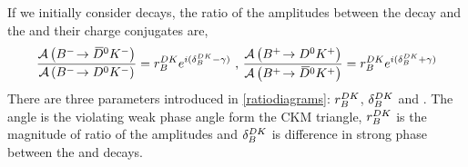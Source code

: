 If we initially consider \decay{\Bm}{\D\Km} decays, the ratio of the amplitudes between the \decay{\Bm}{\Dzb\Km} decay and the \decay{\Bm}{\Dz\Km} and their charge conjugates are,
\begin{equation}
\frac{\mathcal{A}\left({{{B}^-}}\!\rightarrow {\ensuremath{{\kern 0.2em\overline{\kern -0.2em D}{}}{}^0}}{\ensuremath{{K}^-}}\right)}{\mathcal{A}\left({{{B}^-}}\!\rightarrow {\ensuremath{{D}^0}}{\ensuremath{{K}^-}}\right)} = r_B^{DK} e^{i(\delta_B^{DK} - \gamma)} \text{ , }
\frac{\mathcal{A}\left({{{B}^+}}\!\rightarrow {\ensuremath{{D}^0}}{\ensuremath{{K}^+}}\right)}{\mathcal{A}\left({{{B}^+}}\!\rightarrow {\ensuremath{{\kern 0.2em\overline{\kern -0.2em D}{}}{}^0}}{\ensuremath{{K}^+}}\right)} = r_B^{DK} e^{i(\delta_B^{DK} + \gamma)}
\label{ratiodiagrams}
\end{equation}
There are three parameters introduced in \eqn\ref{ratiodiagrams}: $r_B^{DK}$, $\delta_B^{DK}$ and \Pgamma. The angle \Pgamma is the \CP violating weak phase angle form the CKM triangle, $r_B^{DK}$ is the magnitude of ratio of the amplitudes and $\delta_B^{DK}$ is difference in strong phase between the \decay{\Bm}{\Dz\Km} and \decay{\Bm}{\Dzb\Km} decays.

